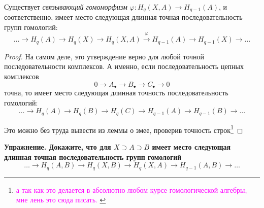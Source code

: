     \begin{theorem}\label{LongExactSequenceOfPair}
        Существует \emph{связывающий гомоморфизм} $\varphi\colon H_{q}(X, A) \to H_{q - 1}(A)$, и соответственно, имеет место следующая длинная точная последовательность групп гомологий:
        \[ \ldots \to H_{q}(A) \to H_{q}(X) \to H_{q}(X, A) \xrightarrow{\varphi} H_{q - 1}(A) \to H_{q - 1}(X) \to \ldots \]
    \end{theorem}
    \begin{proof}
        На самом деле, это утверждение верно для любой точной последовательности комплексов. А именно, если
        последовательность цепных комплексов
        \[ 0 \to A_{\bullet} \to B_{\bullet} \to C_{\bullet} \to 0\]
        точна, то имеет место следующая длинная точность последовательность гомологий:
        \[ \ldots \to  H_{q}(A) \to H_{q}(B) \to H_{q}(C) \to H_{q - 1}(A) \to H_{q - 1}(B) \to \ldots\]

        Это можно без труда вывести из леммы о змее, проверив точность строк\footnote{\textcolor{magenta}{а так как это делается в абсолютно любом курсе гомологической алгебры, мне лень это сюда писать. }}
    \end{proof}

    \noindent\bf{Упражнение.}
    Докажите, что для $X \supset A \supset B$ имеет место следующая длинная точная последовательность групп гомологий
    \[ \ldots \to H_{q}(A, B) \to H_{q}(X, B) \to H_{q}(X, A) \to H_{q - 1}(A, B) \to \ldots \]

